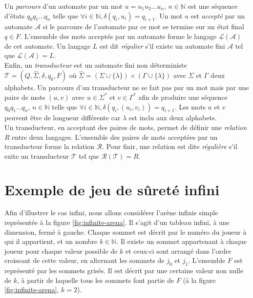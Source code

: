 \documentclass[12pt,a4paper,oneside,titlepage]{report}
\begin{document}
\noindent Un \emph{parcours} d'un automate par un mot $u=u_1u_2...u_n$, $n\in\mathbb{N}$ est une séquence d'états $q_0q_1...q_n$ telle que $\forall i\in\mathbb{N}, \delta(q_i,u_i)=q_{i+1}$. Un mot $u$ est \emph{accepté} par un automate $\mathcal{A}$ si le parcours de l'automate par ce mot se termine sur un état final $q\in F$. L'ensemble des mots acceptés par un automate forme le langage $\mathcal{L}(\mathcal{A})$ de cet automate. Un langage $L$ est dit \emph{régulier} s'il existe un automate fini $\mathcal{A}$ tel que $\mathcal{L}(\mathcal{A})=L$.\\

\noindent Enfin, un \emph{transducteur} est un automate fini non déterministe $\mathcal{T}=(Q,\hat{\Sigma},\delta,q_0,F)$ où $\hat{\Sigma}=(\Sigma\cup\{\lambda\})\times(\Gamma\cup\{\lambda\})$ avec $\Sigma$ et $\Gamma$ deux alphabets. Un parcours d'un transducteur ne se fait pas par un mot mais par une paire de mots $(u,v)$ avec $u\in\Sigma^*$ et $v\in\Gamma^*$ afin de produire une séquence $q_0q_1...q_n$, $n\in\mathbb{N}$ telle que $\forall i\in\mathbb{N}, \delta(q_i,(u_i,v_i))=q_{i+1}$. Les mots $u$ et $v$ peuvent être de longueur différente car $\lambda$ est inclu aux deux alphabets.\\
Un transducteur, en acceptant des paires de mots, permet de définir une \emph{relation} $R$ entre deux langages. L'ensemble des paires de mots acceptées par un transducteur forme la relation $\mathcal{R}$. Pour finir, une relation est dite \emph{régulière} s'il exite un transducteur $\mathcal{T}$ tel que $\mathcal{R}(\mathcal{T})=R$.

\section{Exemple de jeu de sûreté infini}
Afin d'illustrer le cas infini, nous allons considérer l'arène infinie simple représentée à la figure \ref{fig:infinite-arena}. Il s'agit d'un tableau infini, à une dimension, fermé à gauche. Chaque sommet est décrit par le numéro du joueur à qui il appartient, et un nombre $k\in\mathbb{N}$. Il existe un sommet appartenant à chaque joueur pour chaque valeur possible de $k$ et ceux-ci sont arrangé dans l'ordre croissant de cette valeur, en alternant les sommets de $j_0$ et $j_1$. L'ensemble $F$ est représenté par les sommets grisés. Il est décrit par une certaine valeur non nulle de $k$, à partir de laquelle tous les sommets font partie de $F$ (à la figure \ref{fig:infinite-arena}, $k=2$).
\end{document}

